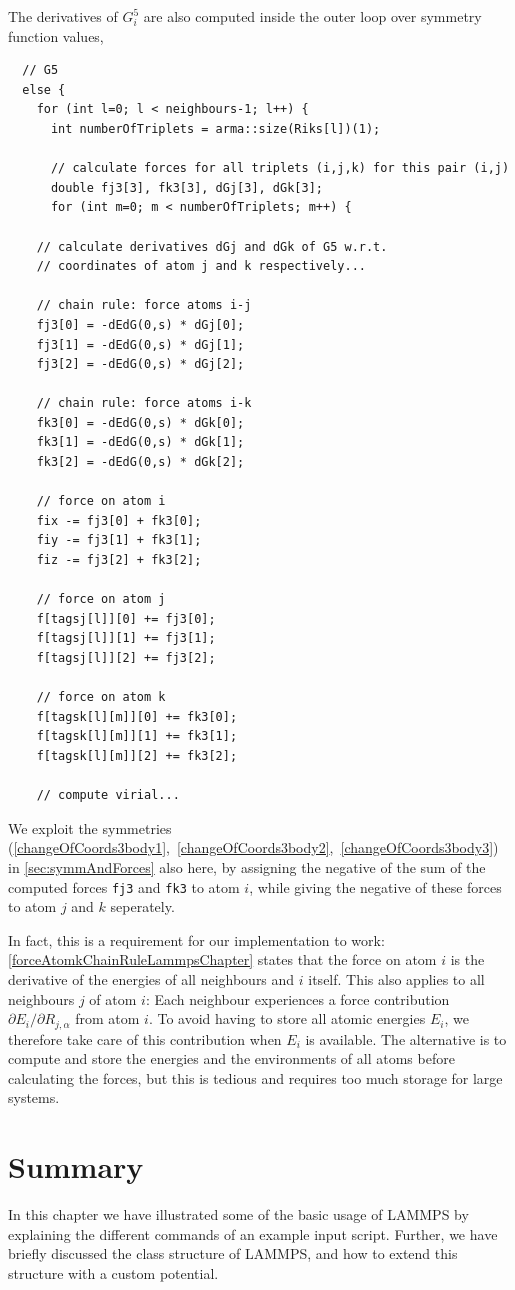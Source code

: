 \documentclass[twoside,english]{uiofysmaster}
\begin{document}
The derivatives of $G_i^5$ are also computed inside the outer loop over symmetry function values,
\begin{verbatim}
  // G5
  else {
    for (int l=0; l < neighbours-1; l++) {
      int numberOfTriplets = arma::size(Riks[l])(1);

      // calculate forces for all triplets (i,j,k) for this pair (i,j)
      double fj3[3], fk3[3], dGj[3], dGk[3];
      for (int m=0; m < numberOfTriplets; m++) {
      
	// calculate derivatives dGj and dGk of G5 w.r.t. 
	// coordinates of atom j and k respectively...

	// chain rule: force atoms i-j
	fj3[0] = -dEdG(0,s) * dGj[0];
	fj3[1] = -dEdG(0,s) * dGj[1];
	fj3[2] = -dEdG(0,s) * dGj[2];

	// chain rule: force atoms i-k
	fk3[0] = -dEdG(0,s) * dGk[0];
	fk3[1] = -dEdG(0,s) * dGk[1];
	fk3[2] = -dEdG(0,s) * dGk[2];

	// force on atom i 
	fix -= fj3[0] + fk3[0];
	fiy -= fj3[1] + fk3[1];
	fiz -= fj3[2] + fk3[2];

	// force on atom j
	f[tagsj[l]][0] += fj3[0];
	f[tagsj[l]][1] += fj3[1];
	f[tagsj[l]][2] += fj3[2];

	// force on atom k
	f[tagsk[l][m]][0] += fk3[0];
	f[tagsk[l][m]][1] += fk3[1];
	f[tagsk[l][m]][2] += fk3[2];
	
	// compute virial... 
\end{verbatim}
We exploit the symmetries 
(\ref{changeOfCoords3body1},~\ref{changeOfCoords3body2},~\ref{changeOfCoords3body3})
in \autoref{sec:symmAndForces} also here, 
by assigning the negative of the sum of the computed forces
\texttt{fj3} and \texttt{fk3} to atom $i$, while giving the negative of these forces to atom $j$ and $k$ seperately.

In fact, this is a requirement for our implementation 
to work: \eqref{forceAtomkChainRuleLammpsChapter} states that
the force on atom $i$ is the derivative of the energies of all neighbours and $i$ itself. This also applies to all neighbours $j$
of atom $i$: Each neighbour experiences a force contribution  $\partial E_i / \partial R_{j,\alpha}$ from atom $i$. To avoid 
having to store all atomic energies $E_i$, we therefore take care of this contribution when $E_i$ is available. 
The alternative is to compute and store the energies and the environments of all atoms before calculating the forces, but this
is tedious and requires too much storage for large systems.

\section{Summary}
In this chapter we have illustrated some of the basic usage of LAMMPS by explaining the different commands of an example 
input script. Further, we have briefly discussed the class structure of LAMMPS, and how to extend this structure 
with a custom potential. 
\end{document}
